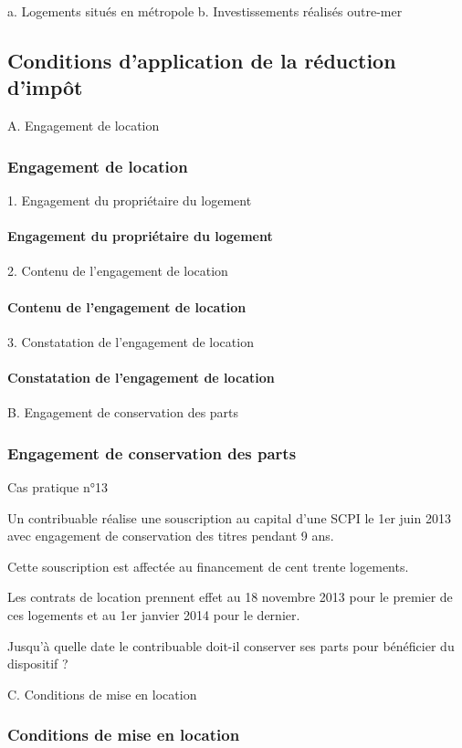 a. Logements situés en métropole
b. Investissements réalisés outre-mer

	\subsection{Conditions d’application de la réduction d’impôt}

A. Engagement de location
		\subsubsection{Engagement de location}


1. Engagement du propriétaire du logement
			\paragraph{Engagement du propriétaire du logement}

2. Contenu de l'engagement de location
			\paragraph{Contenu de l'engagement de location}

3. Constatation de l'engagement de location
			\paragraph{Constatation de l'engagement de location}


B. Engagement de conservation des parts
		\subsubsection{Engagement de conservation des parts}


Cas pratique n°13

Un contribuable réalise une souscription au capital d'une SCPI le 1er juin 2013 avec engagement de conservation des titres pendant 9 ans.

Cette souscription est affectée au financement de cent trente logements.

Les contrats de location prennent effet au 18 novembre 2013 pour le premier de ces logements et au 1er janvier 2014 pour le dernier.

Jusqu’à quelle date le contribuable doit-il conserver ses parts pour bénéficier du dispositif ?

C. Conditions de mise en location
			\subsubsection{Conditions de mise en location}

